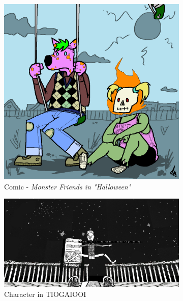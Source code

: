 \begin{figure}[H]
\begin{subfigure}{.4\textwidth}
    \centering
    \includegraphics[width=.9\linewidth]{images/ref_IAN01}
  	\caption{Comic - \textit{Monster Friends in "Halloween"}}
  \label{fig:i1}
  \end{subfigure}
  \begin{subfigure}{.5\textwidth}
    \centering
    \includegraphics[width=.9\linewidth]{images/ref_MICHAEL03}
    \caption{Character in TIOGAIOOI}
    \label{fig:m1}
  \end{subfigure}
  \begin{subfigure}{.5\textwidth}
    \centering

\end{subfigure}
\end{figure}
